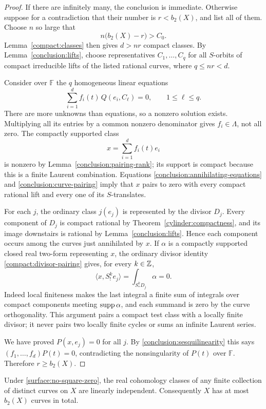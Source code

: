 \begin{proof}
If there are infinitely many, the conclusion is immediate. Otherwise
suppose for a contradiction that their number is $r<b_2(X)$, and list
all of them. Choose $n$ so large that
\[
 n\bigl(b_2(X)-r\bigr)>C_0.
\]
Lemma~\ref{compact:classes} then gives $d>nr$ compact classes.
By Lemma~\ref{conclusion:lifts}, choose representatives
$C_1,\ldots,C_q$ for all $S$-orbits of compact irreducible lifts of the
listed rational curves, where $q\leq nr<d$.

Consider over $\mathbb F$ the $q$ homogeneous linear equations
\begin{equation}\label{conclusion:annihilating-equations}
 \sum_{i=1}^d f_i(t)\,Q(e_i,C_\ell)=0,
 \qquad 1\leq\ell\leq q.
\end{equation}
There are more unknowns than equations, so a nonzero solution exists.
Multiplying all its entries by a common nonzero denominator gives
$f_i\in\Lambda$, not all zero. The compactly supported class
\[
 x=\sum_{i=1}^d f_i(t)e_i
\]
is nonzero by Lemma~\ref{conclusion:pairing-rank}; its support is compact
because this is a finite Laurent combination. Equations
\eqref{conclusion:annihilating-equations} and
\eqref{conclusion:curve-pairing} imply that $x$ pairs to zero with
every compact rational lift and every one of its $S$-translates.

For each $j$, the ordinary class $j(e_j)$ is represented by the divisor
$D_j$. Every component of $D_j$ is compact rational by
Theorem~\ref{cylinder:compactness}, and its image downstairs is rational
by Lemma~\ref{conclusion:lifts}. Hence each component occurs among the
curves just annihilated by $x$. If $\alpha$ is a compactly supported
closed real two-form representing $x$, the ordinary divisor identity
\eqref{compact:divisor-pairing} gives, for every $k\in\mathbb Z$,
\[
 \langle x,S_!^k e_j\rangle
 =\int_{S_*^kD_j}\alpha=0.
\]
Indeed local finiteness makes the last integral a finite sum of
integrals over compact components meeting $\operatorname{supp}\alpha$, and each
summand is zero by the curve orthogonality. This argument pairs a
compact test class with a locally finite divisor; it never pairs two
locally finite cycles or sums an infinite Laurent series.

We have proved $P(x,e_j)=0$ for all $j$. By
\eqref{conclusion:sesquilinearity} this says
$(f_1,\ldots,f_d)P(t)=0$, contradicting the nonsingularity of $P(t)$
over $\mathbb F$. Therefore $r\geq b_2(X)$.
\end{proof}

\begin{lemma}
\label{conclusion:upper-bound}
Under \eqref{surface:no-square-zero}, the real cohomology classes of
any finite collection of distinct curves on $X$ are linearly
independent. Consequently $X$ has at most $b_2(X)$ curves in total.
\end{lemma}

